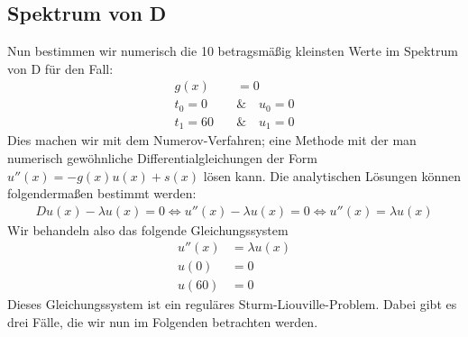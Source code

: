 \documentclass[ngerman]{scrartcl}
\begin{document}
\subsection{Spektrum von D}
	Nun bestimmen wir numerisch die 10 betragsmäßig kleinsten Werte im Spektrum von D für den Fall:
	\begin{align}
		g(x)&=0\\
		t_0=0 \quad&\&\quad u_0=0\nonumber\\
		t_1=60 \quad&\&\quad u_1=0\nonumber
	\end{align}
	Dies machen wir mit dem Numerov-Verfahren; eine Methode mit der man numerisch gewöhnliche Differentialgleichungen der Form $u''(x)=-g(x)u(x)+s(x)$ lösen kann.
	Die analytischen Lösungen können folgendermaßen bestimmt werden:
	\begin{align*}
		D u(x) - \lambda u(x) = 0 \Leftrightarrow u''(x) - \lambda u(x) = 0 \Leftrightarrow u''(x) = \lambda u(x)
	\end{align*}
	Wir behandeln also das folgende Gleichungssystem
	\begin{align}
		u''(x) &= \lambda u(x)\\
		u(0) &= 0\nonumber\\
		u(60) &= 0\nonumber
	\end{align}
	Dieses Gleichungssystem ist ein reguläres Sturm-Liouville-Problem. Dabei gibt es drei Fälle, die wir nun im Folgenden betrachten werden.
\end{document}
